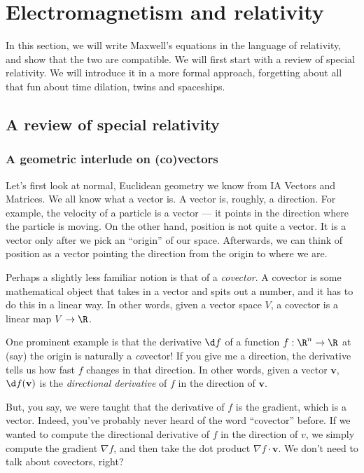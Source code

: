\documentclass[a4paper]{article}
\begin{document}
\section{Electromagnetism and relativity}
In this section, we will write Maxwell's equations in the language of relativity, and show that the two are compatible. We will first start with a review of special relativity. We will introduce it in a more formal approach, forgetting about all that fun about time dilation, twins and spaceships.

\subsection{A review of special relativity}
\subsubsection{A geometric interlude on (co)vectors}
Let's first look at normal, Euclidean geometry we know from IA Vectors and Matrices. We all know what a vector is. A vector is, roughly, a direction. For example, the velocity of a particle is a vector --- it points in the direction where the particle is moving. On the other hand, position is not quite a vector. It is a vector only after we pick an ``origin'' of our space. Afterwards, we can think of position as a vector pointing the direction from the origin to where we are.

Perhaps a slightly less familiar notion is that of a \emph{covector}. A covector is some mathematical object that takes in a vector and spits out a number, and it has to do this in a linear way. In other words, given a vector space $V$, a covector is a linear map $V \to \R$.

One prominent example is that the derivative $\d f$ of a function $f: \R^n \to \R$ at (say) the origin is naturally a \emph{co}vector! If you give me a direction, the derivative tells us how fast $f$ changes in that direction. In other words, given a vector $\mathbf{v}$, $\d f(\mathbf{v})$ is the \emph{directional derivative} of $f$ in the direction of $\mathbf{v}$.

But, you say, we were taught that the derivative of $f$ is the gradient, which is a vector. Indeed, you've probably never heard of the word ``covector'' before. If we wanted to compute the directional derivative of $f$ in the direction of $v$, we simply compute the gradient $\nabla f$, and then take the dot product $\nabla f \cdot \mathbf{v}$. We don't need to talk about covectors, right?
\end{document}
